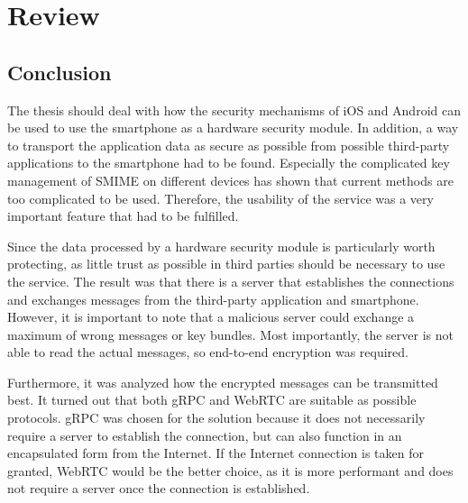 \documentclass[12pt,oneside,a4paper,parskip]{scrbook}
\begin{document}




\chapter{Review}
\section{Conclusion}
The thesis should deal with how the security mechanisms of iOS and Android can be used to use the smartphone as a hardware security module. In addition, a way to transport the application data as secure as possible from possible third-party applications to the smartphone had to be found. Especially the complicated key management of SMIME on different devices has shown that current methods are too complicated to be used. Therefore, the usability of the service was a very important feature that had to be fulfilled.

Since the data processed by a hardware security module is particularly worth protecting, as little trust as possible in third parties should be necessary to use the service. The result was that there is a server that establishes the connections and exchanges messages from the third-party application and smartphone. However, it is important to note that a malicious server could exchange a maximum of wrong messages or key bundles. Most importantly, the server is not able to read the actual messages, so end-to-end encryption was required. 

Furthermore, it was analyzed how the encrypted messages can be transmitted best. It turned out that both gRPC and WebRTC are suitable as possible protocols. gRPC was chosen for the solution because it does not necessarily require a server to establish the connection, but can also function in an encapsulated form from the Internet. If the Internet connection is taken for granted, WebRTC would be the better choice, as it is more performant and does not require a server once the connection is established. 
\end{document}
